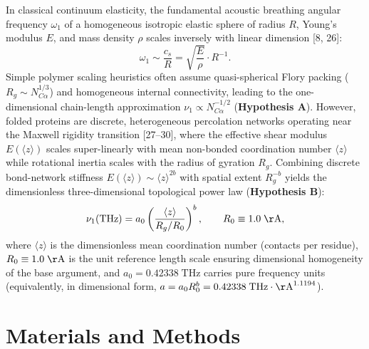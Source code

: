 \documentclass[11pt,onecolumn,letterpaper]{article}
\begin{document}
In classical continuum elasticity, the fundamental acoustic breathing angular frequency $\omega_1$ of a homogeneous isotropic elastic sphere of radius $R$, Young's modulus $E$, and mass density $\rho$ scales inversely with linear dimension [8, 26]:
\begin{equation}
\omega_1 \sim \frac{c_s}{R} = \sqrt{\frac{E}{\rho}} \cdot R^{-1}.
\end{equation}
Simple polymer scaling heuristics often assume quasi-spherical Flory packing ($R_g \sim N_{C\alpha}^{1/3}$) and homogeneous internal connectivity, leading to the one-dimensional chain-length approximation $\nu_1 \propto N_{C\alpha}^{-1/2}$ (\textbf{Hypothesis A}). However, folded proteins are discrete, heterogeneous percolation networks operating near the Maxwell rigidity transition [27--30], where the effective shear modulus $E(\langle z \rangle)$ scales super-linearly with mean non-bonded coordination number $\langle z \rangle$ while rotational inertia scales with the radius of gyration $R_g$. Combining discrete bond-network stiffness $E(\langle z \rangle) \sim \langle z \rangle^{2b}$ with spatial extent $R_g^{-b}$ yields the dimensionless three-dimensional topological power law (\textbf{Hypothesis B}):
\begin{equation}
\nu_1(\mathrm{THz}) = a_0 \left( \frac{\langle z \rangle}{R_g / R_0} \right)^{b}, \qquad R_0 \equiv 1.0\;\mathrm{\AA},
\end{equation}
where $\langle z \rangle$ is the dimensionless mean coordination number (contacts per residue), $R_0 \equiv 1.0\;\mathrm{\AA}$ is the unit reference length scale ensuring dimensional homogeneity of the base argument, and $a_0 = 0.42338\;\mathrm{THz}$ carries pure frequency units (equivalently, in dimensional form, $a = a_0 R_0^b = 0.42338\;\mathrm{THz}\cdot\mathrm{\AA}^{1.1194}$).

\section{Materials and Methods}
\end{document}
